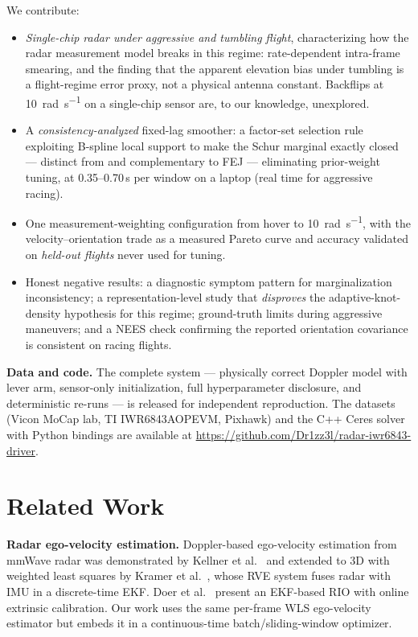 \documentclass[conference]{IEEEtran}
\begin{document}
We contribute:
\begin{itemize}
  \item \emph{Single-chip radar under aggressive and tumbling flight},
        characterizing how the radar measurement model breaks in this
        regime: rate-dependent intra-frame smearing, and the finding
        that the apparent elevation bias under tumbling is a
        flight-regime error proxy, not a physical antenna constant.
        Backflips at \SI{10}{\radian\per\second} on a single-chip
        sensor are, to our knowledge, unexplored.
  \item A \emph{consistency-analyzed} fixed-lag smoother: a factor-set
        selection rule exploiting B-spline local support to make the
        Schur marginal exactly closed --- distinct from and
        complementary to FEJ --- eliminating prior-weight tuning, at
        0.35--0.70\,s per window on a laptop (real time for aggressive
        racing).
  \item One measurement-weighting configuration from hover to
        \SI{10}{\radian\per\second}, with the velocity--orientation
        trade as a measured Pareto curve and accuracy validated on
        \emph{held-out flights} never used for tuning.
  \item Honest negative results: a diagnostic symptom pattern for
        marginalization inconsistency; a representation-level study
        that \emph{disproves} the adaptive-knot-density hypothesis for
        this regime; ground-truth limits during aggressive maneuvers;
        and a NEES check confirming the reported orientation covariance
        is consistent on racing flights.
\end{itemize}

\textbf{Data and code.}
The complete system --- physically correct Doppler model with lever
arm, sensor-only initialization, full hyperparameter disclosure, and
deterministic re-runs --- is released for independent reproduction.
The datasets (Vicon MoCap lab, TI IWR6843AOPEVM, Pixhawk) and the
C++ Ceres solver with Python bindings are available at
\url{https://github.com/Dr1zz3l/radar-iwr6843-driver}.

\section{Related Work}
\label{sec:related}

\textbf{Radar ego-velocity estimation.}
Doppler-based ego-velocity estimation from mmWave radar was
demonstrated by Kellner et al.~\cite{kellner2014instantaneous} and
extended to 3D with weighted least squares by
Kramer et al.~\cite{kramer2020rve}, whose RVE system fuses radar
with IMU in a discrete-time EKF.  Doer et
al.~\cite{doer2020ekf} present an EKF-based RIO with online
extrinsic calibration. Our work uses the same per-frame WLS
ego-velocity estimator but embeds it in a continuous-time
batch/sliding-window optimizer.
\end{document}
